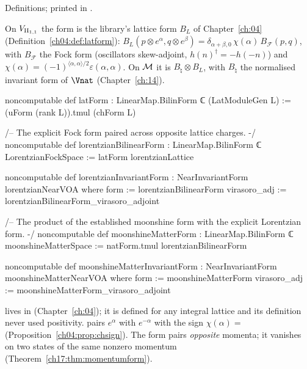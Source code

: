 \begin{status}
Definitions; printed in .
\end{status}

\begin{definition}\label{ch17:def:matterform}
On ${V_{\mathrm{II}_{1,1}}}$ the form is the library's lattice form $B_L$ of Chapter~\ref{ch:04}
(Definition~\ref{ch04:def:latform}): $B_L(p\otimes e^\alpha,q\otimes e^\beta)=\delta_{\alpha+\beta,0}\,\chi(\alpha)\,B_{\mathcal F}(p,q)$, with $B_{\mathcal F}$ the
Fock form (oscillators skew-adjoint, $h(n)^\dagger=-h(-n)$) and $\chi(\alpha)=(-1)^{\langle\alpha,\alpha\rangle/2}\varepsilon(\alpha,\alpha)$.  On
$\mathcal{M}$ it is $B_\natural\otimes B_L$, with $B_\natural$ the normalised invariant form  of $\Vnat$
(Chapter~\ref{ch:14}).
\end{definition}

\begin{leancode}
noncomputable def latForm : LinearMap.BilinForm ℂ (LatModuleGen L) :=
  (uForm (rank L)).tmul (chForm L)

/-- The explicit Fock form paired across opposite lattice charges. -/
noncomputable def lorentzianBilinearForm : LinearMap.BilinForm ℂ LorentzianFockSpace :=
  latForm lorentzianLattice

noncomputable def lorentzianInvariantForm : NearInvariantForm lorentzianNearVOA where
  form := lorentzianBilinearForm
  virasoro_adj := lorentzianBilinearForm_virasoro_adjoint

/-- The product of the established moonshine form with the explicit Lorentzian form. -/
noncomputable def moonshineMatterForm : LinearMap.BilinForm ℂ moonshineMatterSpace :=
  natForm.tmul lorentzianBilinearForm

noncomputable def moonshineMatterInvariantForm : NearInvariantForm moonshineMatterNearVOA where
  form := moonshineMatterForm
  virasoro_adj := moonshineMatterForm_virasoro_adjoint
\end{leancode}

\begin{dictionary}
 lives in  (Chapter~\ref{ch:04}); it is defined for any integral
lattice and its definition never used positivity.   pairs $e^\alpha$ with $e^{-\alpha}$ with the sign
$\chi(\alpha)=$  (Proposition~\ref{ch04:prop:chsign}).  The form pairs \emph{opposite} momenta; it vanishes on
two states of the same nonzero momentum (Theorem~\ref{ch17:thm:momentumform}).
\end{dictionary}


